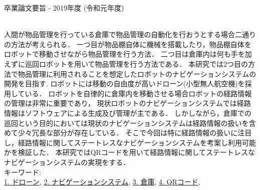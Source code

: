 卒業論文要旨 - 2019年度 (令和元年度)
\begin{center}
\begin{large}
\end{large}
\end{center}
~ \\
人間が物品管理を行っている倉庫で物品管理の自動化を行おうとする場合二通りの方法が考えられる．
一つ目が物品棚自体に機械を搭載したり，物品棚自体をロボットで移動させながら物品管理を行う方法．
二つ目は倉庫内は何も手を加えずに巡回ロボットを用いて物品管理を行う方法である．
本研究では2つ目の方法で物品管理に利用されることを想定したロボットのナビゲーションシステムの開発を目指す.
ロボットには移動の自由度が高いドローン(小型無人航空機)を採用している．
ロボットを自律的に倉庫内を移動させる場合ロボットの経路情報の管理は非常に重要であり，
現状ロボットのナビゲーションシステムでは経路情報はソフトウェアによる生成及び管理が主である．
しかしながら，倉庫での巡回という目的においては現状のナビゲーションシステムは経路情報の扱いを含めて少々冗長な部分が存在している．
そこで今回は特に経路情報の扱いに注目し，経路情報に関してステートレスなナビゲーションシステムを考案し利用可能かを検証した．
本研究ではQRコードを用いて経路情報に関してステートレスなナビゲーションシステムの実現をする．
~ \\
キーワード:\\
\underline{1. ドローン},
\underline{2. ナビゲーションシステム},
\underline{3. 倉庫},
\underline{4. QRコード},
\begin{flushright}
\dept \\
\author
\end{flushright}
